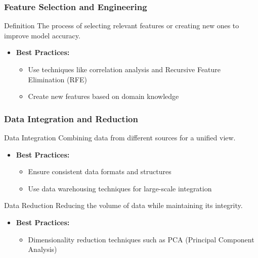 \documentclass{beamer}
\begin{document}
\begin{frame}[fragile]
    \frametitle{Feature Selection and Engineering}
    \begin{block}{Definition}
        The process of selecting relevant features or creating new ones to improve model accuracy.
    \end{block}
    \begin{itemize}
        \item \textbf{Best Practices:}
        \begin{itemize}
            \item Use techniques like correlation analysis and Recursive Feature Elimination (RFE)
            \item Create new features based on domain knowledge
        \end{itemize}
    \end{itemize}
\end{frame}

\begin{frame}[fragile]
    \frametitle{Data Integration and Reduction}
    \begin{block}{Data Integration}
        Combining data from different sources for a unified view.
    \end{block}
    \begin{itemize}
        \item \textbf{Best Practices:}
        \begin{itemize}
            \item Ensure consistent data formats and structures
            \item Use data warehousing techniques for large-scale integration
        \end{itemize}
    \end{itemize} 
    \begin{block}{Data Reduction}
        Reducing the volume of data while maintaining its integrity.
    \end{block}
    \begin{itemize}
        \item \textbf{Best Practices:}
        \begin{itemize}
            \item Dimensionality reduction techniques such as PCA (Principal Component Analysis)
        \end{itemize}
    \end{itemize}
\end{frame}
\end{document}
